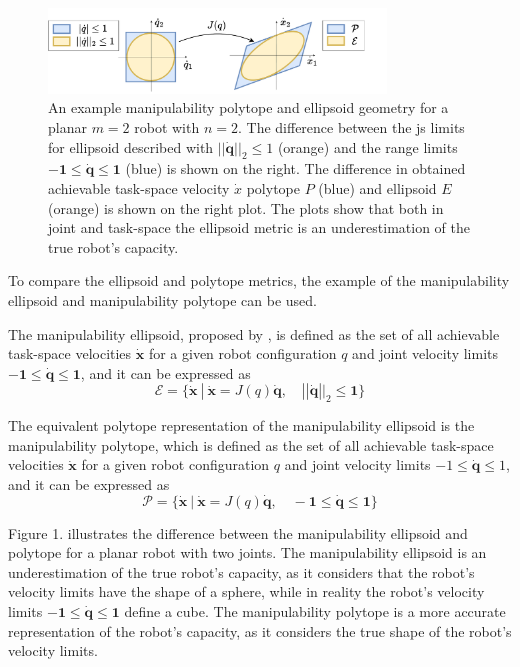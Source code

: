 \begin{figure}[!h]
    \centering
    \includegraphics[width=0.8\textwidth]{Chapters/imgs/ellip_poly.pdf}
    \caption{An example manipulability polytope and ellipsoid geometry for a planar $m=2$ robot with $n=2$. The difference between the \gls{js} limits for ellipsoid described with $||\dot{\bm{q}}||_2\leq1$ (orange) and the range limits $\bm{-1}\leq\dot{\bm{q}}\leq\bm{1}$ (blue) is shown on the right. The difference in obtained achievable task-space velocity $\dot{{x}}$ polytope ${P}$ (blue) and ellipsoid ${E}$ (orange) is shown on the right plot. The plots show that both in joint and task-space the ellipsoid metric is an underestimation of the true robot's capacity.}
    \label{fig:ellip_poly_dif_revisit}
\end{figure}

To compare the ellipsoid and polytope metrics, the example of the manipulability ellipsoid and manipulability polytope can be used. 

The manipulability ellipsoid, proposed by \citet{yoshikawa_manipulability_1985}, is defined as the set of all achievable task-space velocities ${\dot{\bm{x}}}$ for a given robot configuration ${q}$ and joint velocity limits $-\bm{1} \leq {\dot{\bm{q}}}\leq \bm{1}$, and it can be expressed as
\begin{equation}\label{eq:manip_ellipsoid}
\mathcal{E} = \{ \dot{\bm{x}} ~|~ \dot{\bm{x}} = J({q})\dot{\bm{q}}, \quad ||\dot{\bm{q}}||_2 \leq \bm{1} \}
\end{equation}

The equivalent polytope representation of the manipulability ellipsoid is the manipulability polytope, which is defined as the set of all achievable task-space velocities ${\dot{\bm{x}}}$ for a given robot configuration ${q}$ and joint velocity limits $-1 \leq {\dot{\bm{q}}}\leq 1$, and it can be expressed as
\begin{equation}\label{eq:manip_polytope}
\mathcal{P} = \{ \dot{\bm{x}} ~|~ \dot{\bm{x}} = J({q})\dot{\bm{q}}, \quad -\bm{1} \leq \dot{\bm{q}} \leq \bm{1} \}
\end{equation}

Figure 1. illustrates the difference between the manipulability ellipsoid and polytope for a planar robot with two joints. The manipulability ellipsoid is an underestimation of the true robot's capacity, as it considers that the robot's velocity limits have the shape of a sphere, while in reality the robot's velocity limits $-\bm{1} \leq {\dot{\bm{q}}}\leq \bm{1}$ define a cube. The manipulability polytope is a more accurate representation of the robot's capacity, as it considers the true shape of the robot's velocity limits. 


